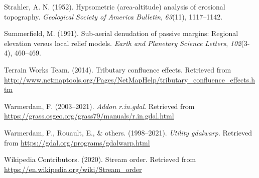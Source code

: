 \documentclass[11pt,]{article}
\begin{document}
\hypertarget{ref-strahler1952hypsometric}{}
Strahler, A. N. (1952). Hypsometric (area-altitude) analysis of
erosional topography. \emph{Geological Society of America Bulletin},
\emph{63}(11), 1117--1142.

\hypertarget{ref-summerfield1991sub}{}
Summerfield, M. (1991). Sub-aerial denudation of passive margins:
Regional elevation versus local relief models. \emph{Earth and Planetary
Science Letters}, \emph{102}(3-4), 460--469.

\hypertarget{ref-tributary}{}
Terrain Works Team. (2014). Tributary confluence effects. Retrieved from
\url{http://www.netmaptools.org/Pages/NetMapHelp/tributary_confluence_effects.htm}

\hypertarget{ref-ringdal}{}
Warmerdam, F. (2003--2021). \emph{Addon r.in.gdal}. Retrieved from
\url{https://grass.osgeo.org/grass79/manuals/r.in.gdal.html}

\hypertarget{ref-gdalwarp}{}
Warmerdam, F., Rouault, E., \& others. (1998--2021). \emph{Utility
gdalwarp}. Retrieved from \url{https://gdal.org/programs/gdalwarp.html}

\hypertarget{ref-wikipedia2020stream}{}
Wikipedia Contributors. (2020). Stream order. Retrieved from
\url{https://en.wikipedia.org/wiki/Stream_order}




\newpage
\singlespacing 
\end{document}
